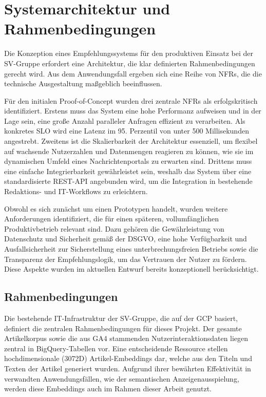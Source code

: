 \section{Systemarchitektur und Rahmenbedingungen}

Die Konzeption eines Empfehlungssystems für den produktiven Einsatz bei der SV-Gruppe erfordert eine Architektur, die klar definierten Rahmenbedingungen gerecht wird. 
Aus dem Anwendungsfall ergeben sich eine Reihe von \ac{NFR}s, die die technische Ausgestaltung maßgeblich beeinflussen.

\label{sec:nfr}
Für den initialen Proof-of-Concept wurden drei zentrale NFRs als erfolgskritisch identifiziert. 
Erstens muss das System eine hohe Performanz aufweisen und in der Lage sein, eine große Anzahl paralleler Anfragen effizient zu verarbeiten. 
Als konkretes \ac{SLO} wird eine Latenz im 95. Perzentil von unter 500 Millisekunden angestrebt. 
Zweitens ist die Skalierbarkeit der Architektur essenziell, um flexibel auf wachsende Nutzerzahlen und Datenmengen reagieren zu können, 
wie sie im dynamischen Umfeld eines Nachrichtenportals zu erwarten sind. Drittens muss eine einfache Integrierbarkeit gewährleistet sein, 
weshalb das System über eine standardisierte REST-API angebunden wird, um die Integration in bestehende Redaktions- und IT-Workflows zu erleichtern.

Obwohl es sich zunächst um einen Prototypen handelt, wurden weitere Anforderungen identifiziert, die für einen späteren, 
vollumfänglichen Produktivbetrieb relevant sind. Dazu gehören die Gewährleistung von Datenschutz und Sicherheit gemäß der \ac{DSGVO}, 
eine hohe Verfügbarkeit und Ausfallsicherheit zur Sicherstellung eines unterbrechungsfreien Betriebs sowie die Transparenz der Empfehlungslogik, 
um das Vertrauen der Nutzer zu fördern. Diese Aspekte wurden im aktuellen Entwurf bereits konzeptionell berücksichtigt.

\subsection{Rahmenbedingungen}

Die bestehende IT-Infrastruktur der SV-Gruppe, die auf der \ac{GCP} basiert, definiert die zentralen Rahmenbedingungen für dieses Projekt. 
Der gesamte Artikelkorpus sowie die aus \ac{GA4} stammenden Nutzerinteraktionsdaten liegen zentral in BigQuery-Tabellen vor. 
Eine entscheidende Ressource stellen hochdimensionale (3072D) Artikel-Embeddings dar, 
welche aus den Titeln und Texten der Artikel generiert wurden. Aufgrund ihrer bewährten Effektivität in verwandten Anwendungsfällen, 
wie der semantischen Anzeigenausspielung, werden diese Embeddings auch im Rahmen dieser Arbeit genutzt.

